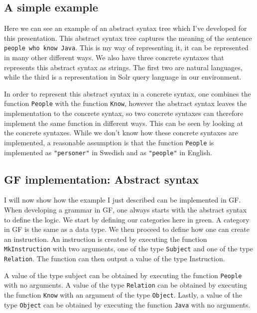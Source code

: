 \documentclass[
10pt, %
a4paper, %
oneside, %
headinclude,footinclude, %
BCOR5mm, %
]{scrartcl}
\begin{document}
\subsection{A simple example}
Here we can see an example of an abstract syntax tree which I've developed for this presentation. This abstract syntax tree captures the meaning of the sentence \texttt{people who know Java}. This is my way of representing it, it can be represented in many other different ways.
\newline
\newline
We also have three concrete syntaxes that represents this abstract syntax as strings. The first two are natural languages, while the third is a representation in Solr query language in our environment.

In order to represent this abstract syntax in a concrete syntax, one combines the function \texttt{People} with the function \texttt{Know}, however the abstract syntax leaves the implementation to the concrete syntax, so two concrete syntaxes can therefore implement the same function in different ways. This can be seen by looking at the concrete syntaxes. While we don't know how these concrete syntaxes are implemented, a reasonable assumption is that the function \texttt{People} is implemented as \texttt{"personer"} in Swedish and as \texttt{"people"} in English.

\subsection{GF implementation: Abstract syntax}
I will now show how the example I just described can be implemented in GF. When developing a grammar in GF, one always starts with the abstract syntax to define the logic.
\newline
\newline
We start by defining our categories here in green. A category in GF is the same as a data type.
\newline
\newline
We then proceed to define how one can create an instruction. An instruction is created by executing the function \texttt{MkInstruction} with two arguments, one of the type \texttt{Subject} and one of the type \texttt{Relation}. The function can then output a value of the type Instruction.

A value of the type subject can be obtained by executing the function \texttt{People} with no arguments. A value of the type \texttt{Relation} can be obtained by executing the function \texttt{Know} with an argument of the type \texttt{Object}. Lastly, a value of the type \texttt{Object} can be obtained by executing the function \texttt{Java} with no arguments.
\end{document}
